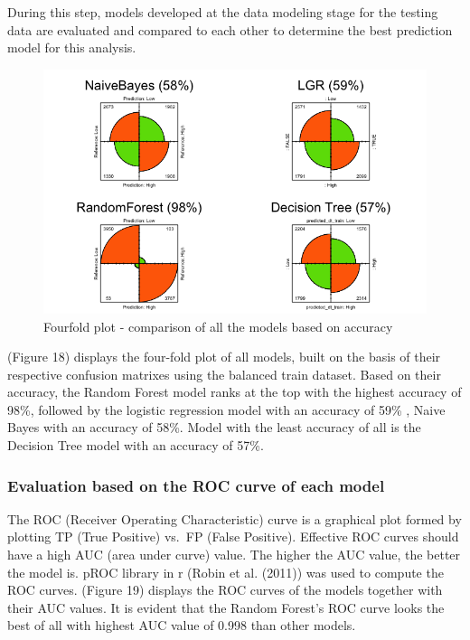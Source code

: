 \documentclass[
  a4paper,
]{article}
\begin{document}
During this step, models developed at the data modeling stage for the
testing data are evaluated and compared to each other to determine the
best prediction model for this analysis.

\begin{figure}[h!]

{\centering \includegraphics[width=0.75\linewidth]{fourfold train} 

}

\caption{Fourfold plot - comparison of all the models based on accuracy}\label{fig:unnamed-chunk-19}
\end{figure}

(Figure 18) displays the four-fold plot of all models, built on the
basis of their respective confusion matrixes using the balanced train
dataset. Based on their accuracy, the Random Forest model ranks at the
top with the highest accuracy of 98\%, followed by the logistic
regression model with an accuracy of 59\% , Naive Bayes with an accuracy
of 58\%. Model with the least accuracy of all is the Decision Tree model
with an accuracy of 57\%.

\hypertarget{evaluation-based-on-the-roc-curve-of-each-model}{%
\subsubsection{Evaluation based on the ROC curve of each
model}\label{evaluation-based-on-the-roc-curve-of-each-model}}

The ROC (Receiver Operating Characteristic) curve is a graphical plot
formed by plotting TP (True Positive) vs.~FP (False Positive). Effective
ROC curves should have a high AUC (area under curve) value. The higher
the AUC value, the better the model is. pROC library in r (Robin et al.
(2011)) was used to compute the ROC curves. (Figure 19) displays the ROC
curves of the models together with their AUC values. It is evident that
the Random Forest's ROC curve looks the best of all with highest AUC
value of 0.998 than other models.
\end{document}
